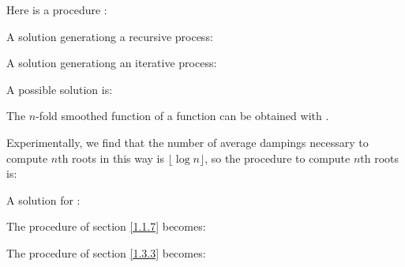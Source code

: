 \begin{exe}[1.42]
    Here is a procedure :
\end{exe}

\begin{exe}[1.43]
    \label{1.43}
    A solution generationg a recursive process:

    A solution generationg an iterative process:
\end{exe}

\begin{exe}[1.44]
    A possible solution is:

    The $n$-fold smoothed function of a function  can be obtained with
    .
\end{exe}

\begin{exe}[1.45]
    Experimentally, we find that the number of average dampings necessary to 
    compute $n$th roots in this way is $\lfloor \log n \rfloor$, so the 
    procedure to compute $n$th roots is:
\end{exe}

\begin{exe}[1.46]
    A solution for :

    The  procedure of section \ref{1.1.7} becomes:

    The  procedure of section \ref{1.3.3} becomes:
\end{exe}

